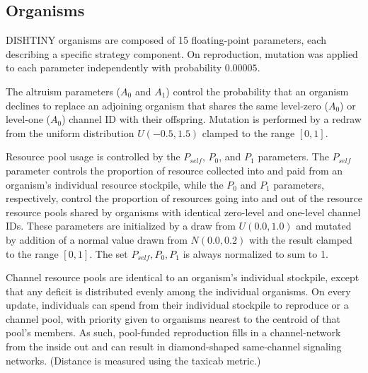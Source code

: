 \subsection{Organisms}

DISHTINY organisms are composed of 15 floating-point parameters,
each describing a specific strategy component.
On reproduction, mutation was applied to each parameter independently with probability $0.00005$.

The altruism parameters ($A_0$ and $A_1$) control the probability that an organism declines to replace an adjoining organism that shares the same level-zero ($A_0$) or level-one ($A_0$) channel ID with their offspring.
Mutation is performed by a redraw from the uniform distribution $U(-0.5,1.5)$ clamped to the range $[0,1]$.

Resource pool usage is controlled by the $P_{self}$, $P_0$, and $P_1$ parameters.
The $P_{self}$ parameter controls the proportion of resource collected into and paid from an organism's individual resource stockpile, while the $P_0$ and $P_1$ parameters, respectively, control the proportion of resources going into and out of the resource resource pools shared by organisms with identical zero-level and one-level channel IDs.
These parameters are initialized by a draw from $U(0.0, 1.0)$ and mutated by addition of a normal value drawn from $N(0.0,0.2)$ with the result clamped to the range $[0,1]$.
The set $P_{self}, P_0, P_1$ is always normalized to sum to 1.

Channel resource pools are identical to an organism's individual stockpile, except that any deficit is distributed evenly among the individual organisms.
On every update, individuals can spend from their individual stockpile to reproduce
or a channel pool, with priority given to organisms nearest to the centroid of that pool's members.
As such, pool-funded reproduction fills in a channel-network from the inside out and can result in diamond-shaped same-channel signaling networks.
(Distance is measured using the taxicab metric.)


